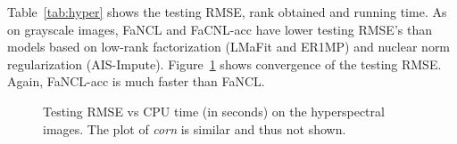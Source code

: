 \documentclass[10pt,journal,compsoc]{IEEEtran}
\begin{document}
Table~\ref{tab:hyper} shows the testing RMSE,  rank obtained and running time.
As on grayscale images,
\textsf{FaNCL} and \textsf{FaCNL-acc} have lower testing RMSE's than models based on low-rank factorization 
(\textsf{LMaFit} and \textsf{ER1MP})
and nuclear norm regularization
(\textsf{AIS-Impute}). 
Figure~\ref{fig:rmse:hyper} shows convergence of
the testing RMSE.
Again,
\textsf{FaNCL-acc} is much faster than \textsf{FaNCL}.

\begin{figure}[ht]
\centering

\vspace{-10px}
\caption{Testing RMSE vs CPU time (in seconds) on the hyperspectral images.
	The plot of \textit{corn} is similar and thus not shown.}
\label{fig:rmse:hyper}
\end{figure}
\end{document}
